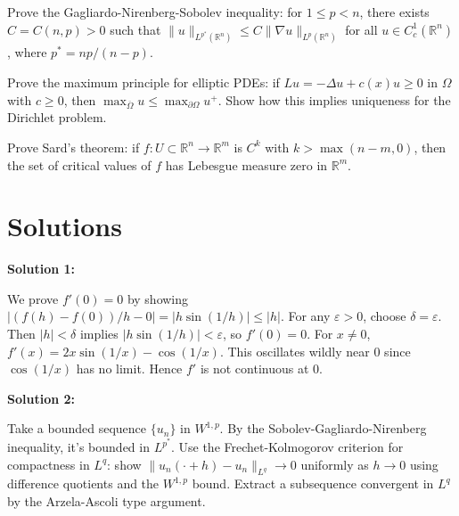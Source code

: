 \documentclass[12pt,a4paper]{exam}
\begin{document}
\begin{questions}
\vspace{0.3cm}

\question[6]
Prove the Gagliardo-Nirenberg-Sobolev inequality: for $1 \leq p < n$, there exists $C = C(n,p) > 0$ such that $\|u\|_{L^{p^*}(\mathbb{R}^n)} \leq C \|\nabla u\|_{L^p(\mathbb{R}^n)}$ for all $u \in C_c^1(\mathbb{R}^n)$, where $p^* = np/(n-p)$.

\vspace{0.3cm}

\question[3]
Prove the maximum principle for elliptic PDEs: if $Lu = -\Delta u + c(x) u \geq 0$ in $\Omega$ with $c \geq 0$, then $\max_{\overline{\Omega}} u \leq \max_{\partial\Omega} u^+$. Show how this implies uniqueness for the Dirichlet problem.

\vspace{0.3cm}

\question[2]
Prove Sard's theorem: if $f: U \subset \mathbb{R}^n \to \mathbb{R}^m$ is $C^k$ with $k > \max(n-m, 0)$, then the set of critical values of $f$ has Lebesgue measure zero in $\mathbb{R}^m$.

\vspace{0.3cm}

\end{questions}

\newpage
\section*{Solutions}

\textbf{Solution 1:}

We prove $f'(0) = 0$ by showing $|(f(h) - f(0))/h - 0| = |h \sin(1/h)| \leq |h|$. For any $\varepsilon > 0$, choose $\delta = \varepsilon$. Then $|h| < \delta$ implies $|h \sin(1/h)| < \varepsilon$, so $f'(0)=0$. For $x \neq 0$, $f'(x) = 2x \sin(1/x) - \cos(1/x)$. This oscillates wildly near 0 since $\cos(1/x)$ has no limit. Hence $f'$ is not continuous at 0.

\vspace{0.5cm}

\textbf{Solution 2:}

Take a bounded sequence $\{u_n\}$ in $W^{1,p}$. By the Sobolev-Gagliardo-Nirenberg inequality, it's bounded in $L^{p^*}$. Use the Frechet-Kolmogorov criterion for compactness in $L^q$: show $\|u_n(\cdot + h) - u_n\|_{L^q} \to 0$ uniformly as $h \to 0$ using difference quotients and the $W^{1,p}$ bound. Extract a subsequence convergent in $L^q$ by the Arzela-Ascoli type argument.

\vspace{0.5cm}
\end{document}
